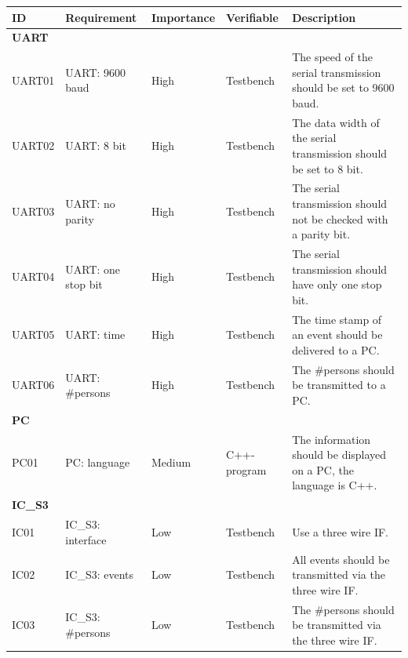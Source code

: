\documentclass[12pt,a4 paper] {report}
\begin{document}
\begin{center}
	\begin{tabular}{|p{1.5cm}|p{3.5cm}|p{2cm}|p{2cm}|p{6cm}|}
		\hline
		\textbf{ID} & \textbf{Requirement} & \textbf{Importance} & \textbf{Verifiable} & \textbf{Description}\\
		\hline
		\textbf{UART} & & & & \\
		\hline
		UART01 & UART: 9600 baud & High &  Testbench & The speed of the serial transmission should be set to 9600 baud. \\
		\hline
		UART02 & UART: 8 bit & High & Testbench & The data width of the serial transmission should be set to 8 bit. \\
		\hline
		UART03 & UART: no parity & High & Testbench & The serial transmission should not be checked with a parity bit. \\
		\hline
		UART04 & UART: one stop bit & High  & Testbench & The serial transmission should have only one stop bit. \\
		\hline
		UART05 & UART: time & High & Testbench  & The time stamp of an event should be delivered to a PC. \\
		\hline
		UART06 & UART: \#persons & High &  Testbench &  The \#persons should be transmitted to a PC. \\
		\hline
		\textbf{PC} & & & & \\
		\hline	
		PC01 & PC: language & Medium & C++-program &  The information should be displayed on a PC, the language is C++. \\
		\hline
		\textbf{IC\_S3} & & & & \\
		\hline
		IC01 & IC\_S3: interface & Low & Testbench & Use a three wire IF. \\
		\hline
		IC02 & IC\_S3: events & Low & Testbench & All events should be transmitted via the three wire IF. \\
		\hline
		IC03 & IC\_S3: \#persons & Low  & Testbench & The \#persons should be transmitted via the three wire IF. \\
		\hline
	\end{tabular}
\end{center}

\newpage
\end{document}
